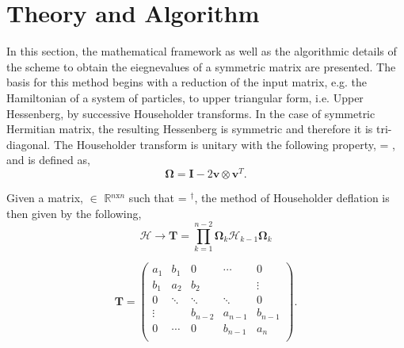 \documentclass[twocolumn]{article}
\begin{document}
\section{Theory and Algorithm}\label{sec:algo}

\indent \indent In this section, the mathematical framework as well as the algorithmic details of the scheme to obtain the eiegnevalues of a symmetric matrix are presented.  The basis for this method begins with a reduction of the input matrix, e.g. the Hamiltonian of a system of particles, to upper triangular form, i.e. Upper Hessenberg, by successive Householder\cite{HOUSEHOLDER} transforms.  In the case of symmetric Hermitian matrix, the resulting Hessenberg is symmetric and therefore it is tri-diagonal.  The Householder transform is unitary with the following property, \bm{$\Omega$}  = , and is defined as,
\begin{equation}\label{eq:house}
\bm{\Omega} = \bm{I} - 2\bm{v}\otimes \bm{v}^{T}.
\end{equation}

Given a matrix,  $\in$  $\mathbb{R}$$^{n \text{x} n}$ such that  = $^{\dagger}$, the method of Householder deflation is then given by the following,
\begin{equation}\label{eq:tridiag}
\bm{\mathcal{H}} \rightarrow \bm{T} = \prod_{k=1}^{n-2} \bm{\Omega}_{k}\bm{\mathcal{H}}_{k-1}\bm{\Omega}_{k}
\end{equation}

\[
\bm{T} = \left(
\begin{array}{ccccc}
a_{1}  &  b_{1}  &  0  &  \cdots  & 0\\
b_{1}  &  a_{2}  &  b_{2}  &   & \vdots  \\
0  &  \ddots  &  \ddots  &  \ddots  & 0\\
\vdots  &    &  b_{n-2}  &  a_{n-1}  & b_{n-1}\\
0  &  \cdots  &  0  &  b_{n-1}  & a_{n}\\
\end{array}
\right).
\]
\end{document}
